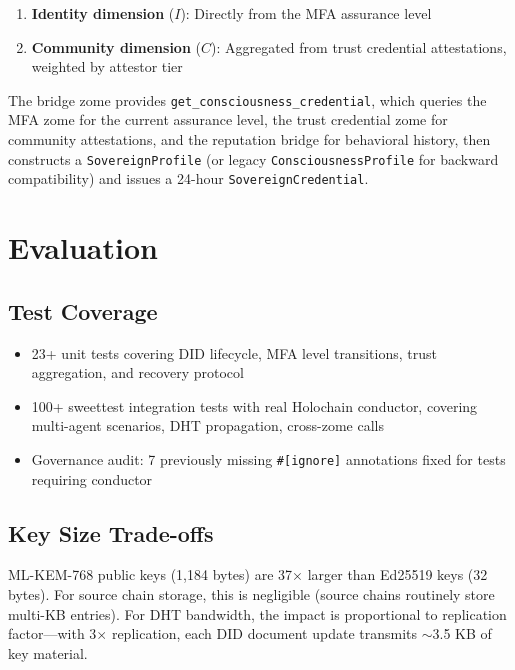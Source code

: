 \documentclass[11pt,twocolumn]{article}
\begin{document}
\begin{enumerate}[nosep]
  \item \textbf{Identity dimension} ($I$): Directly from the MFA assurance level
  \item \textbf{Community dimension} ($C$): Aggregated from trust credential
    attestations, weighted by attestor tier
\end{enumerate}

The bridge zome provides \texttt{get\_consciousness\_credential}, which queries
the MFA zome for the current assurance level, the trust credential zome for
community attestations, and the reputation bridge for behavioral history, then
constructs a \texttt{SovereignProfile} (or legacy \texttt{ConsciousnessProfile} for backward compatibility) and issues a 24-hour
\texttt{SovereignCredential}.

\section{Evaluation}

\subsection{Test Coverage}

\begin{itemize}[nosep]
  \item 23+ unit tests covering DID lifecycle, MFA level transitions, trust
    aggregation, and recovery protocol
  \item 100+ sweettest integration tests with real Holochain conductor,
    covering multi-agent scenarios, DHT propagation, cross-zome calls
  \item Governance audit: 7 previously missing \texttt{\#[ignore]} annotations
    fixed for tests requiring conductor
\end{itemize}

\subsection{Key Size Trade-offs}

ML-KEM-768 public keys (1,184 bytes) are 37$\times$ larger than Ed25519 keys
(32 bytes). For source chain storage, this is negligible (source chains routinely
store multi-KB entries). For DHT bandwidth, the impact is proportional to
replication factor---with 3$\times$ replication, each DID document update
transmits $\sim$3.5 KB of key material.
\end{document}
